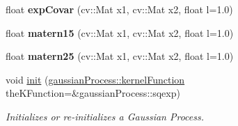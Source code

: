 \begin{DoxyCompactItemize}
\item 
\hypertarget{classgaussianProcess_a6d4ad47b956da99a42b55d241f495ac1}{
float {\bfseries expCovar} (cv::Mat x1, cv::Mat x2, float l=1.0)}
\label{classgaussianProcess_a6d4ad47b956da99a42b55d241f495ac1}

\item 
\hypertarget{classgaussianProcess_a4ba8aaa5843115a7c7cf9c6d5b6910bb}{
float {\bfseries matern15} (cv::Mat x1, cv::Mat x2, float l=1.0)}
\label{classgaussianProcess_a4ba8aaa5843115a7c7cf9c6d5b6910bb}

\item 
\hypertarget{classgaussianProcess_a1365efcf45710b7b56607410083a0ebe}{
float {\bfseries matern25} (cv::Mat x1, cv::Mat x2, float l=1.0)}
\label{classgaussianProcess_a1365efcf45710b7b56607410083a0ebe}

\item 
\hypertarget{classgaussianProcess_aa83375d606ce70a4305aee30412112b8}{
void \hyperlink{classgaussianProcess_aa83375d606ce70a4305aee30412112b8}{init} (\hyperlink{classgaussianProcess_a9255dbcbf2dc6ef9723b538659acd491}{gaussianProcess::kernelFunction} theKFunction=\&gaussianProcess::sqexp)}
\label{classgaussianProcess_aa83375d606ce70a4305aee30412112b8}

\begin{DoxyCompactList}\small\item\em Initializes or re-\/initializes a Gaussian Process. \item\end{DoxyCompactList}\end{DoxyCompactItemize}
